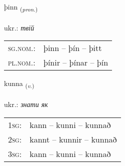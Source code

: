 \documentclass[frontgrid, backgrid]{flacards}\usepackage[]{graphicx}\usepackage[]{xcolor}
\begin{document}
\renewcommand{\flhead}{\vskip5pt \fboxsep=0pt {\small\bfseries\footnotesize Fornafn | займенник}}
\renewcommand{\fcfoot}{\vskip5pt \fboxsep=0pt \hspace{2pt}{\small\bfseries\footnotesize 1K}}

\renewcommand{\blhead}{\vskip5pt {\small\bfseries\footnotesize Fornafn | займенник }}
\renewcommand{\bcfoot}{\vskip5pt \hspace{2pt}{\small\bfseries\footnotesize 1K}}


{þinn \small{\textsubscript{(\textit{pron.})}} \\[1ex] %
\textphonetic{[θɪn]} \\
ukr.: \emph{твій} \\  [2ex]
\renewcommand*{\arraystretch}{0.8}
\begin{tabular}{ll}
\textsc{sg.nom.}: & þinn  --  þín -- þitt \\ 
\textsc{pl.nom.}: & þínir -- þínar -- þín
\end{tabular}
}

\renewcommand{\flhead}{\vskip5pt \fboxsep=0pt {\small\bfseries\footnotesize Sagnorð | дієслово}}
\renewcommand{\fcfoot}{\vskip5pt \fboxsep=0pt \hspace{2pt}{\small\bfseries\footnotesize 1K}}

\renewcommand{\blhead}{\vskip5pt {\small\bfseries\footnotesize Sagnorð | дієслово }}
\renewcommand{\bcfoot}{\vskip5pt \hspace{2pt}{\small\bfseries\footnotesize 1K}}


{kunna \small{\textsubscript{(\textit{v.})}} \\[1ex] %
\textphonetic{[kʰʏna]} \\
ukr.: \emph{знати як} \\  [2ex]
\renewcommand*{\arraystretch}{0.8}
\begin{tabular}{p{1cm}l}
\textsc{1sg}: & kann -- kunni -- kunnað \\ 
\textsc{2sg}: & kannt -- kunnir -- kunnað \\ 
\textsc{3sg}: & kann -- kunni -- kunnað \\ 
\end{tabular}
}
\end{document}
